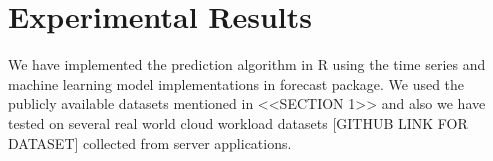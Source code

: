 \section{Experimental Results}

We have implemented the prediction algorithm in R using the time series and machine learning model implementations in forecast package. We used the publicly available datasets mentioned in <<SECTION 1>> and also we have tested on several real world cloud workload datasets [GITHUB LINK FOR DATASET] collected from server applications.

